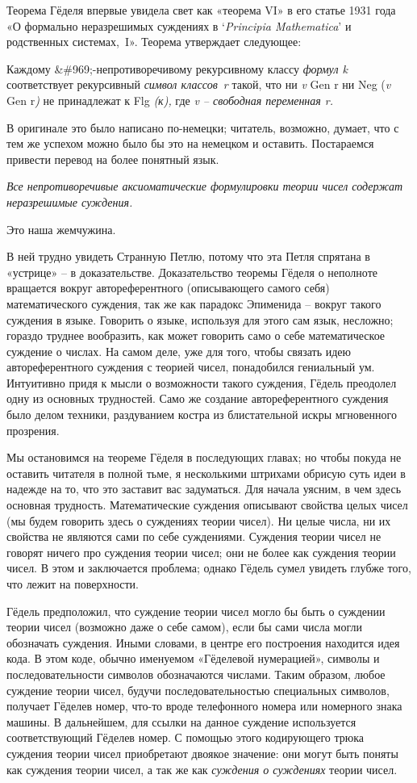 \documentclass[../main.tex]{subfiles}
\begin{document}
Теорема Гёделя впервые увидела свет как «теорема VI» в его статье 1931 года «О формально неразрешимых суждениях в \enquote*{\emph{Principia Mathematica}} и родственных системах,~I». Теорема утверждает следующее:

Каждому \&\#969;-непротиворечивому рекурсивному классу \emph{формул k} соответствует рекурсивный \emph{символ классов~r} такой, что ни \emph{v} Gen r ни Neg (\emph{v} Gen r\emph{)} не принадлежат к Flg \emph{(к),} где \emph{v \--- свободная переменная r.}

В оригинале это было написано по-немецки; читатель, возможно, думает, что с тем же успехом можно было бы это на немецком и оставить. Постараемся привести перевод на более понятный язык.

\emph{Все непротиворечивые аксиоматические формулировки теории чисел содержат неразрешимые суждения.}

Это наша жемчужина.

В ней трудно увидеть Странную Петлю, потому что эта Петля спрятана в «устрице» \--- в доказательстве. Доказательство теоремы Гёделя о неполноте вращается вокруг автореферентного (описывающего самого себя) математического суждения, так же как парадокс Эпименида \--- вокруг такого суждения в языке. Говорить о языке, используя для этого сам язык, несложно; гораздо труднее вообразить, как может говорить само о себе математическое суждение о числах. На самом деле, уже для того, чтобы связать идею автореферентного суждения с теорией чисел, понадобился гениальный ум. Интуитивно придя к мысли о возможности такого суждения, Гёдель преодолел одну из основных трудностей. Само же создание автореферентного суждения было делом техники, раздуванием костра из блистательной искры мгновенного прозрения.

Мы остановимся на теореме Гёделя в последующих главах; но чтобы покуда не оставить читателя в полной тьме, я несколькими штрихами обрисую суть идеи в надежде на то, что это заставит вас задуматься. Для начала уясним, в чем здесь основная трудность. Математические суждения описывают свойства целых чисел (мы будем говорить здесь о суждениях теории чисел). Ни целые числа, ни их свойства не являются сами по себе суждениями. Суждения теории чисел не говорят ничего про суждения теории чисел; они не более как суждения теории чисел. В этом и заключается проблема; однако Гёдель сумел увидеть глубже того, что лежит на поверхности.

Гёдель предположил, что суждение теории чисел могло бы быть о суждении теории чисел (возможно даже о себе самом), если бы сами числа могли обозначать суждения. Иными словами, в центре его построения находится идея кода. В этом коде, обычно именуемом «Гёделевой нумерацией», символы и последовательности символов обозначаются числами. Таким образом, любое суждение теории чисел, будучи последовательностью специальных символов, получает Гёделев номер, что-то вроде телефонного номера или номерного знака машины. В дальнейшем, для ссылки на данное суждение используется соответствующий Гёделев номер. С помощью этого кодирующего трюка суждения теории чисел приобретают двоякое значение: они могут быть поняты как суждения теории чисел, а так же как \emph{суждения о суждениях} теории чисел.
\end{document}
